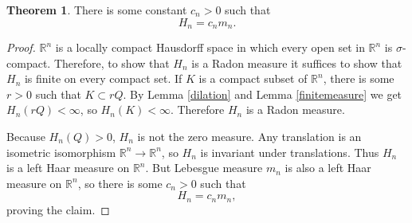 \documentclass{article}
\theoremstyle{definition}
\newtheorem{theorem}{Theorem}
\theoremstyle{definition}
\begin{document}
\begin{theorem}
There is some constant $c_n>0$ such that 
\[
H_n = c_n m_n.
\]
\end{theorem}
\begin{proof}
$\mathbb{R}^n$ is a locally compact Hausdorff space in which
every open set in $\mathbb{R}^n$ is $\sigma$-compact. Therefore, to show that $H_n$ is a Radon measure it suffices to show that
$H_n$ is finite on every compact set.
If $K$ is a compact subset of $\mathbb{R}^n$, there is some $r>0$ such that $K \subset rQ$. By
Lemma \ref{dilation} and Lemma \ref{finitemeasure} we get
$H_n(rQ)<\infty$, so $H_n(K)<\infty$. Therefore $H_n$ is a Radon measure.

Because $H_n(Q)>0$, $H_n$ is not the zero measure. 
Any translation is an isometric isomorphism $\mathbb{R}^n \to \mathbb{R}^n$, so $H_n$ is invariant under translations.
Thus $H_n$ is a  left Haar measure on $\mathbb{R}^n$. But Lebesgue measure $m_n$ is also a left Haar measure on $\mathbb{R}^n$,
so there is some $c_n>0$ such that
\[
H_n = c_n m_n,
\]
proving the claim.
\end{proof}
\end{document}

